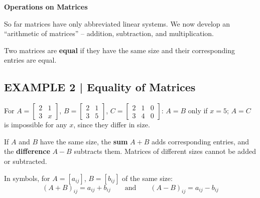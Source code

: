 \documentclass{article}
\newcommand{\redheading}[1]{{\vspace{2mm}\noindent\Large\bfseries\color{red!55!black} #1\par}\vspace{2mm}}
\theoremstyle{mystyle}
\begin{document}
\redheading{Operations on Matrices}

So far matrices have only abbreviated linear systems. We now develop an ``arithmetic of matrices'' -- addition, subtraction, and multiplication.

\begin{tcolorbox}[colback=teal!4, colframe=teal!65!black, title=Definition 2, fonttitle=\bfseries, boxrule=0.5mm, arc=3mm]
Two matrices are \textbf{equal} if they have the same size and their corresponding entries are equal.
\end{tcolorbox}

\subsection*{EXAMPLE 2 | Equality of Matrices}
For $A=\begin{bmatrix}2&1\\3&x\end{bmatrix}$, $B=\begin{bmatrix}2&1\\3&5\end{bmatrix}$, $C=\begin{bmatrix}2&1&0\\3&4&0\end{bmatrix}$: $A=B$ only if $x=5$; $A=C$ is impossible for any $x$, since they differ in size.

\begin{tcolorbox}[colback=teal!4, colframe=teal!65!black, title=Definition 3, fonttitle=\bfseries, boxrule=0.5mm, arc=3mm]
If $A$ and $B$ have the same size, the \textbf{sum} $A+B$ adds corresponding entries, and the \textbf{difference} $A-B$ subtracts them. Matrices of different sizes cannot be added or subtracted.
\end{tcolorbox}
In symbols, for $A=[a_{ij}]$, $B=[b_{ij}]$ of the same size:
\[
(A+B)_{ij}=a_{ij}+b_{ij}\qquad\text{and}\qquad (A-B)_{ij}=a_{ij}-b_{ij}
\]
\end{document}
